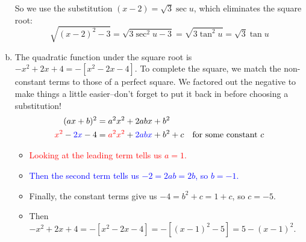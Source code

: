 \begin{solution}
\begin{enumerate}[(a)]
So we use the substitution $(x-2) = \sqrt{3}\sec u$, which eliminates the square root:
\[\sqrt{\left(x-2\right)^2-3}=\sqrt{3\sec^2 u - 3} = \sqrt{3\tan^2 u} = \sqrt{3}\tan u\]
%
\item
The quadratic function under the square root is $-x^2+2x+4=-[x^2-2x-4]$. To complete the square, we match the non-constant terms to those of a perfect square. We factored out the negative to make things a little easier--don't forget to put it back in before choosing a substitution!
\begin{align*}
(ax+b)^2&=a^2x^2+2abx+b^2\\
\textcolor{red}{x^2}-\textcolor{blue}{2x}-4&=\textcolor{red}{a^2x^2} + \textcolor{blue}{2abx} +b^2 + c \quad\mbox{for some constant $c$}
\end{align*}
\begin{itemize}
\item \textcolor{red}{Looking at the leading term tells us $a=1$. }
\item \textcolor{blue}{Then the second term tells us $-2=2ab=2b$, so $b=-1$.}
\item Finally, the constant terms give us $-4=b^2+c=1+c$, so $c=-5$.
\item Then $-x^2+2x+4 = -[x^2-2x-4]=-[(x-1)^2-5]=5-(x-1)^2$.
\end{itemize}


\end{enumerate}
\end{solution}
